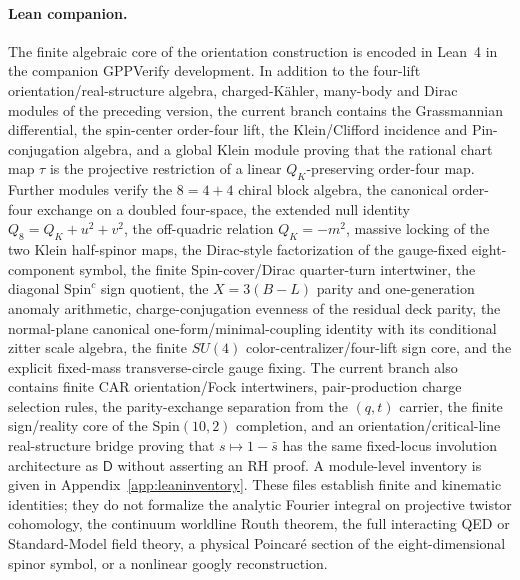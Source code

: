 \documentclass[11pt]{article}
\theoremstyle{definition}\newtheorem{definition}[theorem]{Definition}
\theoremstyle{remark}\newtheorem{remark}[theorem]{Remark}\newtheorem{conjecture}[theorem]{Conjecture}
\begin{document}
\paragraph{Lean companion.}
The finite algebraic core of the orientation construction is encoded in Lean~4 in the companion GPPVerify development. In addition to the four-lift orientation/real-structure algebra, charged-K\"ahler, many-body and Dirac modules of the preceding version, the current branch contains the Grassmannian differential, the spin-center order-four lift, the Klein/Clifford incidence and Pin-conjugation algebra, and a global Klein module proving that the rational chart map $\tau$ is the projective restriction of a linear $Q_K$-preserving order-four map. Further modules verify the $8=4+4$ chiral block algebra, the canonical order-four exchange on a doubled four-space, the extended null identity $Q_8=Q_K+u^2+v^2$, the off-quadric relation $Q_K=-m^2$, massive locking of the two Klein half-spinor maps, the Dirac-style factorization of the gauge-fixed eight-component symbol, the finite Spin-cover/Dirac quarter-turn intertwiner, the diagonal $\mathrm{Spin}^c$ sign quotient, the $X=3(B-L)$ parity and one-generation anomaly arithmetic, charge-conjugation evenness of the residual deck parity, the normal-plane canonical one-form/minimal-coupling identity with its conditional zitter scale algebra, the finite $SU(4)$ color-centralizer/four-lift sign core, and the explicit fixed-mass transverse-circle gauge fixing. The current branch also contains finite CAR orientation/Fock intertwiners, pair-production charge selection rules, the parity-exchange separation from the $(q,t)$ carrier, the finite sign/reality core of the $\mathrm{Spin}(10,2)$ completion, and an orientation/critical-line real-structure bridge proving that $s\mapsto1-\bar s$ has the same fixed-locus involution architecture as $\mathsf D$ without asserting an RH proof. A module-level inventory is given in Appendix~\ref{app:leaninventory}. These files establish finite and kinematic identities; they do not formalize the analytic Fourier integral on projective twistor cohomology, the continuum worldline Routh theorem, the full interacting QED or Standard-Model field theory, a physical Poincar\'e section of the eight-dimensional spinor symbol, or a nonlinear googly reconstruction.
\end{document}
